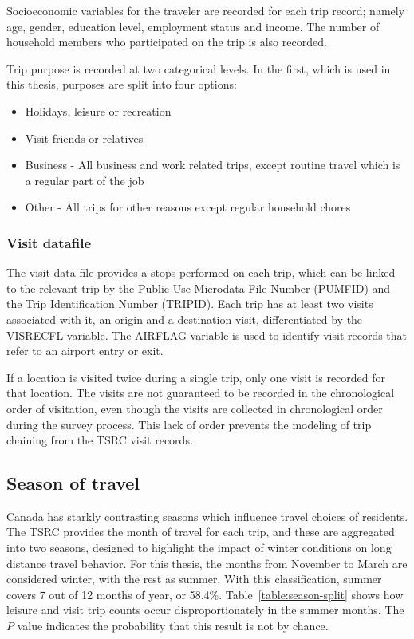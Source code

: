 Socioeconomic variables for the traveler are recorded for each trip record; namely age, gender, education level, employment status and income. The number of household members who participated on the trip is also recorded.

Trip purpose is  recorded at two categorical levels. In the first, which is used in this thesis, purposes are split into four options:
\begin{itemize}
\item Holidays, leisure or recreation
\item Visit friends or relatives
\item Business - All business and work related trips, except routine travel which is a regular part of the job
\item Other - All trips for other reasons except regular household chores
\end{itemize}

\subsubsection*{Visit datafile}
The visit data file provides a stops performed on each trip, which can be linked to the relevant trip by the Public Use Microdata File Number (PUMFID) and the Trip Identification Number (TRIPID). Each trip has at least two visits associated with it, an origin and a destination visit, differentiated by the VISRECFL variable. The AIRFLAG variable is used to identify visit records that refer to an airport entry or exit. 

If a location is visited twice during a single trip, only one visit is recorded for that location. The visits are not guaranteed to be recorded in the chronological order of visitation, even though the visits are collected in chronological order during the survey process. This lack of order prevents the modeling of trip chaining from the TSRC visit records.

\subsection{Season of travel}
Canada has starkly contrasting seasons which influence travel choices of residents. The TSRC provides the month of travel for each trip, and these are aggregated into two seasons, designed to highlight the impact of winter conditions on long distance travel behavior. For this thesis, the months from November to March are considered winter, with the rest as summer. With this classification, summer covers 7 out of 12 months of year, or 58.4\%. Table~\ref{table:season-split} shows how leisure and visit trip counts occur disproportionately in the summer months. The $P$ value indicates the probability that this result is not by chance.

